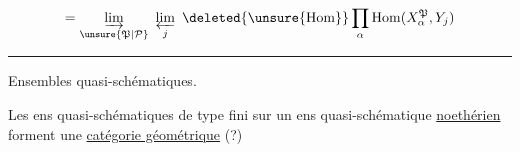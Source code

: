 \[
= \varinjlim_{\unsure{\mathfrak P|\mathcal P}}\ \varprojlim_j\
\deleted{\unsure{\operatorname{Hom}}}\prod_\alpha
\operatorname{Hom}(X_\alpha^{\mathfrak P},Y_j)
\]

\begin{center}\rule{1.4cm}{0.4pt}\end{center}

\noindent\llap{\raisebox{-1.1ex}{\rule{0.35pt}{2.4ex}}\hspace{.35em}}Ensembles quasi-schématiques.

Les ens quasi-schématiques de type fini sur un  ens quasi-schématique \uline{noethérien} forment une \uline{catégorie géométrique} (?)
